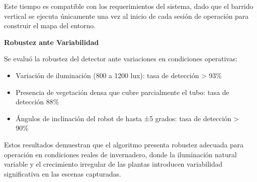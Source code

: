 Este tiempo es compatible con los requerimientos del sistema, dado que el barrido vertical se ejecuta únicamente una vez al inicio de cada sesión de operación para construir el mapa del entorno.

\textbf{Robustez ante Variabilidad}

Se evaluó la robustez del detector ante variaciones en condiciones operativas:

\begin{itemize}
\item Variación de iluminación (800 a 1200 lux): tasa de detección > 93\%
\item Presencia de vegetación densa que cubre parcialmente el tubo: tasa de detección 88\%
\item Ángulos de inclinación del robot de hasta ±5 grados: tasa de detección > 90\%
\end{itemize}

Estos resultados demuestran que el algoritmo presenta robustez adecuada para operación en condiciones reales de invernadero, donde la iluminación natural variable y el crecimiento irregular de las plantas introducen variabilidad significativa en las escenas capturadas.
